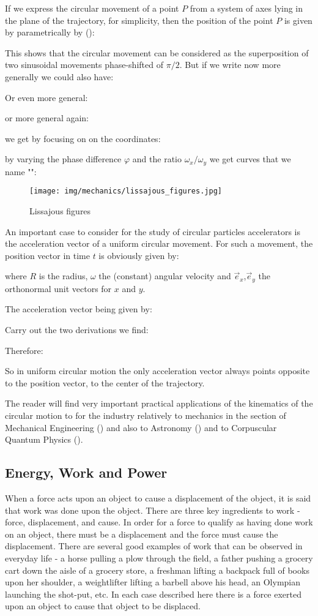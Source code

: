 	If we express the circular movement of a point $P$ from a system of axes lying in the plane of the trajectory, for simplicity, then the position of the point $P$ is given by parametrically by ():
	
	This shows that the circular movement can be considered as the superposition of two sinusoidal  movements phase-shifted of $\pi/2$. But if we write now more generally we could also have:
	
	Or even more general:
	
	or more general again:
	
	we get by focusing on on the coordinates:
	
	by varying the phase difference $\varphi$ and the ratio $\omega_x/\omega_y$ we get curves that we name "":
	\begin{figure}[H]
		\centering
		\texttt{[image: img/mechanics/lissajous\_figures.jpg]}
		\caption{Lissajous figures}
	\end{figure}
	An important case to consider for the study of circular particles accelerators is the acceleration vector of a uniform circular movement. For such a movement, the position vector in time $t$ is obviously given by:	
	
	where $R$ is the radius, $\omega$ the (constant) angular velocity and $\vec{e}_x$,$\vec{e}_y$ the orthonormal unit vectors for $x$ and $y$.

	The acceleration vector being given by:
	
	Carry out the two derivations we find:
	
	Therefore:
	
	So in uniform circular motion the only acceleration vector always points opposite to the position vector, to the center of the trajectory.
	
	The reader will find very important practical applications of the kinematics of the circular motion to for the industry relatively to mechanics in the section of Mechanical Engineering () and also to Astronomy () and to Corpuscular Quantum Physics ().
	
	\pagebreak
	\subsection{Energy, Work and Power}
	When a force acts upon an object to cause a displacement of the object, it is said that work was done upon the object. There are three key ingredients to work - force, displacement, and cause. In order for a force to qualify as having done work on an object, there must be a displacement and the force must cause the displacement. There are several good examples of work that can be observed in everyday life - a horse pulling a plow through the field, a father pushing a grocery cart down the aisle of a grocery store, a freshman lifting a backpack full of books upon her shoulder, a weightlifter lifting a barbell above his head, an Olympian launching the shot-put, etc. In each case described here there is a force exerted upon an object to cause that object to be displaced.
	
